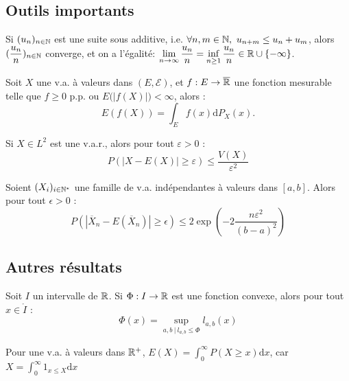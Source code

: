 \documentclass[11pt,a4paper]{article}
\begin{document}
\subsection*{Outils importants}

\begin{lemmastar}
[Fekete] Si $(u_n)_{n\in\mathbb N}$ est une suite sous additive, i.e. $\forall n,m\in \N, \ u_{n+m} \leq u_n + u_m$, alors $\displaystyle (\frac{u_n}{n})_{n\in\mathbb N}$ converge, et on a l'égalité:  $\displaystyle \lim\limits_{n\to \infty} \frac{u_n}{n}=\inf_{n\geq 1} \frac{u_n}{n} \in \mathbb R \cup \{ -\infty\}$.
\end{lemmastar}

\begin{propstar}
 Soit $X$ une v.a. à valeurs dans $(E,\mathcal{E})$, et $f :E\to \overline{\mathbb R}$ une fonction mesurable telle que $f\geq0$ p.p. ou $E\big( \left|f(X)\right| \big) <\infty$, alors :
\[E(f(X))=\int_E f(x)\mathrm{d}P_X(x).\]
\end{propstar}

\begin{corstar}
 Si $X\in L^2$ est une v.a.r., alors pour tout $\varepsilon >0$ :
\[P(|X-E(X)| \geq \varepsilon) \leq \frac{V(X)}{\varepsilon^2}\]
\end{corstar}

\begin{propstar}
Soient $(X_i)_{i\in \mathbb N^*}$ une famille de v.a. indépendantes à valeurs dans $[a,b]$. Alors pour tout $\epsilon > 0$ :
\[P( |\overline{X}_n - E(\overline{X}_n) | \geq \epsilon) \leq 2 \exp(-2\frac{n\varepsilon^2}{(b-a)^2})\]
\end{propstar}

\subsection*{Autres résultats}

\begin{lemmastar}
Soit $I$ un intervalle de $\mathbb R$. Si $ \Phi :I \to \mathbb R$ est une fonction convexe, alors pour tout $x\in \mathring{I}$ :
\[\Phi(x) = \sup_{a,b \ | \ l_{a,b} \leq \Phi } l_{a,b}(x)\]
\end{lemmastar}

\begin{lemmastar}
Pour une v.a. à valeurs dans $\mathbb R^+$, $\displaystyle E(X)=\int_0^\infty P(X \geq x) \mathrm{d}x$, car $\displaystyle X=\int_0^\infty 1_{x\leq X} \mathrm{d}x$
\end{lemmastar} 
\end{document}
